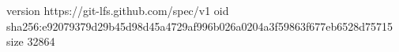 version https://git-lfs.github.com/spec/v1
oid sha256:e92079379d29b45d98d45a4729af996b026a0204a3f59863f677eb6528d75715
size 32864
